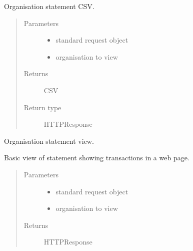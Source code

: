 \documentclass[letterpaper,10pt,english]{sphinxmanual}
\begin{document}
\begin{fulllineitems}
\label{\detokenize{payments:payments.views.statement_csv_org}}
Organisation statement CSV.
\begin{quote}\begin{description}
\item[{Parameters}] \leavevmode\begin{itemize}
\item {} 
 \textendash{} standard request object

\item {} 
 \textendash{} organisation to view

\end{itemize}

\item[{Returns}] \leavevmode
CSV

\item[{Return type}] \leavevmode
HTTPResponse

\end{description}\end{quote}

\end{fulllineitems}


\begin{fulllineitems}
\label{\detokenize{payments:payments.views.statement_org}}
Organisation statement view.

Basic view of statement showing transactions in a web page.
\begin{quote}\begin{description}
\item[{Parameters}] \leavevmode\begin{itemize}
\item {} 
 \textendash{} standard request object

\item {} 
 \textendash{} organisation to view

\end{itemize}

\item[{Returns}] \leavevmode
HTTPResponse

\end{description}\end{quote}

\end{fulllineitems}
\end{document}
